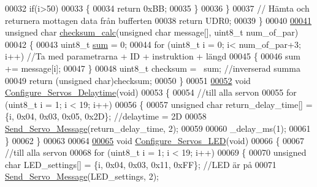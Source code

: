 \begin{DoxyCode}
00032         \textcolor{keywordflow}{if}(i>50)
00033         \{
00034             \textcolor{keywordflow}{return} 0xBB;
00035         \}
00036     \}
00037     \textcolor{comment}{// Hämta och returnera mottagen data från bufferten}
00038     \textcolor{keywordflow}{return} UDR0;
00039 \}
00040 
\hypertarget{servo___u_a_r_t_8c_source.tex_l00041}{}\hyperlink{servo___u_a_r_t_8h_a45e02356d032e2069888899bf1a987bf}{00041} \textcolor{keywordtype}{unsigned} \textcolor{keywordtype}{char} \hyperlink{servo___u_a_r_t_8c_ab388e52c7139a00514d89616ec7da33d}{checksum\_calc}(\textcolor{keywordtype}{unsigned} \textcolor{keywordtype}{char} message[], uint8\_t num\_of\_par)
00042 \{
00043     uint8\_t \hyperlink{sensor_8h_a2943e5895f5488ed44ed4a86e59dcf1b}{sum} = 0;
00044     \textcolor{keywordflow}{for} (uint8\_t i = 0; i< num\_of\_par+3; i++) \textcolor{comment}{//Ta med parametrarna + ID + instruktion + längd}
00045     \{
00046         sum += message[i];
00047     \}
00048     uint8\_t checksum = ~sum; \textcolor{comment}{//inverserad summa }
00049     \textcolor{keywordflow}{return} (\textcolor{keywordtype}{unsigned} \textcolor{keywordtype}{char})checksum;
00050 \}
00051 
\hypertarget{servo___u_a_r_t_8c_source.tex_l00052}{}\hyperlink{servo___u_a_r_t_8h_a7522eb3c86cfa713aade9cbe082bcbba}{00052} \textcolor{keywordtype}{void} \hyperlink{servo___u_a_r_t_8c_a7522eb3c86cfa713aade9cbe082bcbba}{Configure\_Servos\_Delaytime}(\textcolor{keywordtype}{void})
00053 \{
00054     \textcolor{comment}{//till alla servon}
00055     \textcolor{keywordflow}{for} (uint8\_t i = 1; i < 19; i++)
00056     \{
00057         \textcolor{keywordtype}{unsigned} \textcolor{keywordtype}{char} return\_delay\_time[] = \{i, 0x04, 0x03, 0x05, 0x2D\}; \textcolor{comment}{//delaytime = 2D}
00058         \hyperlink{servo___u_a_r_t_8c_a2ed3a2903977a774d1b174665d50661c}{Send\_Servo\_Message}(return\_delay\_time, 2);
00059         
00060         \_delay\_ms(1);
00061     \}
00062 \}
00063 
00064 
\hypertarget{servo___u_a_r_t_8c_source.tex_l00065}{}\hyperlink{servo___u_a_r_t_8h_ae7bfd5ff29686df194ec9f4e310cf2e4}{00065} \textcolor{keywordtype}{void} \hyperlink{servo___u_a_r_t_8c_ae7bfd5ff29686df194ec9f4e310cf2e4}{Configure\_Servos\_LED}(\textcolor{keywordtype}{void})
00066 \{
00067     \textcolor{comment}{//till alla servon}
00068     \textcolor{keywordflow}{for} (uint8\_t i = 1; i < 19; i++)
00069     \{
00070         \textcolor{keywordtype}{unsigned} \textcolor{keywordtype}{char} LED\_settings[] = \{i, 0x04, 0x03, 0x11, 0xFF\}; \textcolor{comment}{//LED  är på }
00071         \hyperlink{servo___u_a_r_t_8c_a2ed3a2903977a774d1b174665d50661c}{Send\_Servo\_Message}(LED\_settings, 2);

\end{DoxyCode}

